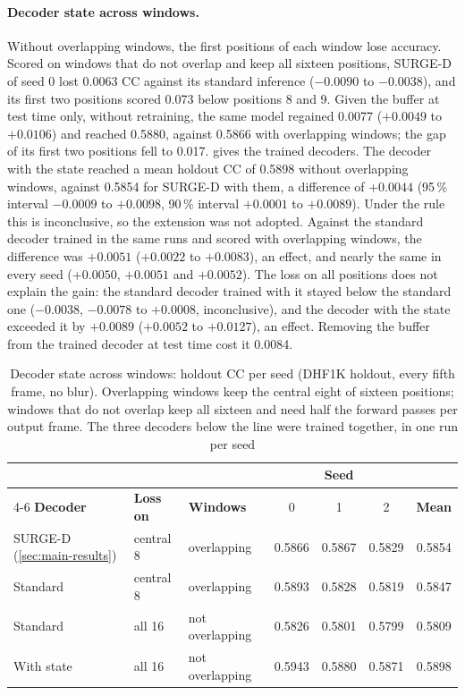 \paragraph{Decoder state across windows.} Without overlapping windows, the
first positions of each window lose accuracy. Scored on windows that do not
overlap and keep all sixteen positions, SURGE-D of seed 0 lost 0.0063
\acrshort{CC} against its standard inference ($-0.0090$ to $-0.0038$), and its
first two positions scored 0.073 below positions 8 and 9. Given the buffer at
test time only, without retraining, the same model regained 0.0077 ($+0.0049$
to $+0.0106$) and reached 0.5880, against 0.5866 with overlapping windows; the
gap of its first two positions fell to 0.017.  gives the
trained decoders. The decoder with the state reached a mean holdout
\acrshort{CC} of 0.5898 without overlapping windows, against 0.5854 for SURGE-D
with them, a difference of $+0.0044$ (95\,\% interval $-0.0009$ to $+0.0098$,
90\,\% interval $+0.0001$ to $+0.0089$). Under the rule this is inconclusive,
so the extension was not adopted. Against the standard decoder trained in the
same runs and scored with overlapping windows, the difference was $+0.0051$
($+0.0022$ to $+0.0083$), an effect, and nearly the same in every seed
($+0.0050$, $+0.0051$ and $+0.0052$). The loss on all positions does not
explain the gain: the standard decoder trained with it stayed below the
standard one ($-0.0038$, $-0.0078$ to $+0.0008$, inconclusive), and the
decoder with the state exceeded it by $+0.0089$ ($+0.0052$ to $+0.0127$), an
effect. Removing the buffer from the trained decoder at test time cost it
0.0084.

\begin{table}[htbp]
  \centering
  \caption{Decoder state across windows: holdout \acrshort{CC} per seed (DHF1K
  holdout, every fifth frame, no blur). Overlapping windows keep the central
  eight of sixteen positions; windows that do not overlap keep all sixteen and
  need half the forward passes per output frame. The three decoders below the
  line were trained together, in one run per seed}\label{tab:state}
  \footnotesize
  \begin{tabular}{@{}lllcccc@{}}
    \toprule
    & & & \multicolumn{3}{c}{\textbf{Seed}} & \\
    \cmidrule(lr){4-6}
    \textbf{Decoder} & \textbf{Loss on} & \textbf{Windows} & 0 & 1 & 2 & \textbf{Mean} \\
    \midrule
    SURGE-D (\cref{sec:main-results}) & central 8 & overlapping & 0.5866 & 0.5867 & 0.5829 & 0.5854 \\
    \midrule
    Standard   & central 8 & overlapping     & 0.5893 & 0.5828 & 0.5819 & 0.5847 \\
    Standard   & all 16    & not overlapping & 0.5826 & 0.5801 & 0.5799 & 0.5809 \\
    With state & all 16    & not overlapping & 0.5943 & 0.5880 & 0.5871 & 0.5898 \\
    \bottomrule
  \end{tabular}
\end{table}

